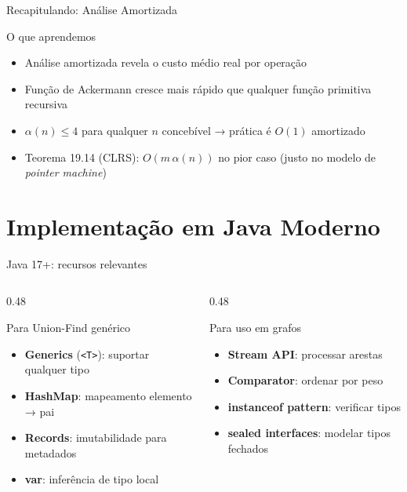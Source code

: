 \documentclass[aspectratio=169]{beamer}
\begin{document}
\begin{frame}{Recapitulando: Análise Amortizada}%
  \begin{block}{O que aprendemos}
    \begin{itemize}
      \item Análise amortizada revela o custo médio real por operação
      \item Função de Ackermann cresce mais rápido que qualquer função primitiva recursiva
      \item $\alpha(n) \leq 4$ para qualquer $n$ concebível → prática é $O(1)$ amortizado
      \item Teorema 19.14 (CLRS): $O(m\,\alpha(n))$ no pior caso (justo no modelo de \emph{pointer machine})
    \end{itemize}
  \end{block}
\end{frame}

\section{Implementação em Java Moderno}

\begin{frame}{Java 17+: recursos relevantes}%
  \begin{columns}[T]
    \begin{column}{0.48\textwidth}
      \begin{block}{Para Union-Find genérico}
        \begin{itemize}
          \item \textbf{Generics} (\texttt{<T>}): suportar qualquer tipo
          \item \textbf{HashMap}: mapeamento elemento → pai
          \item \textbf{Records}: imutabilidade para metadados
          \item \textbf{var}: inferência de tipo local
        \end{itemize}
      \end{block}
    \end{column}
    \begin{column}{0.48\textwidth}
      \begin{block}{Para uso em grafos}
        \begin{itemize}
          \item \textbf{Stream API}: processar arestas
          \item \textbf{Comparator}: ordenar por peso
          \item \textbf{instanceof pattern}: verificar tipos
          \item \textbf{sealed interfaces}: modelar tipos fechados
        \end{itemize}
      \end{block}
    \end{column}
  \end{columns}
\end{frame}
\end{document}

